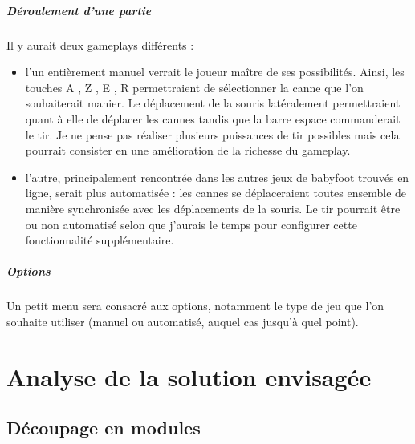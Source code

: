 \documentclass[a4paper,12pt]{report}
\begin{document}
\paragraph{Déroulement d'une partie}
Il y aurait deux gameplays différents : 
\begin{itemize}
    \item l'un entièrement manuel verrait le joueur maître de ses possibilités. Ainsi, les touches \og A \fg, \og Z \fg, \og E \fg, \og R \fg permettraient de sélectionner la canne que l'on souhaiterait manier. Le déplacement de la souris latéralement permettraient quant à elle de déplacer les cannes tandis que la barre espace commanderait le tir. Je ne pense pas réaliser plusieurs puissances de tir possibles mais cela pourrait consister en une amélioration de la richesse du gameplay.
    \item l'autre, principalement rencontrée dans les autres jeux de babyfoot trouvés en ligne, serait plus automatisée : les cannes se déplaceraient toutes ensemble de manière synchronisée avec les déplacements de la souris. Le tir pourrait être ou non automatisé selon que j'aurais le temps pour configurer cette fonctionnalité supplémentaire.
\end{itemize}
\paragraph{Options}
Un petit menu sera consacré aux options, notamment le type de jeu que l'on souhaite utiliser (manuel ou automatisé, auquel cas jusqu'à quel point).


\chapter{Analyse de la solution envisagée}


\section{Découpage en modules}
\end{document}
